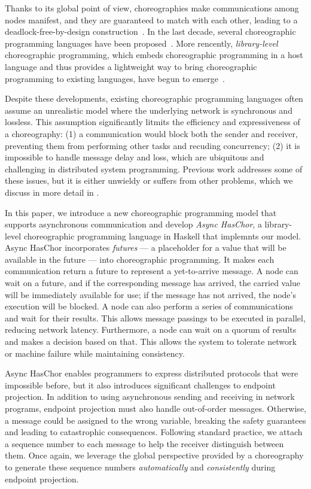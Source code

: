 Thanks to its global point of view, choreographies make communications among nodes manifest, and they are guaranteed to match with each other, leading to a deadlock-free-by-design construction~\citep{deadlock-free-by-design}.
%
In the last decade, several choreographic programming languages have been proposed~\citep{aiocj, choral, pirouette}.
%
More rencently, \emph{library-level} choreographic programming, which embeds choreographic programming in a host language and thus provides a lightweight way to bring choreographic programming to existing languages, have begun to emerge~\citep{haschor, chorus}.

Despite these developments, existing choreographic programming languages often assume an unrealistic model where the underlying network is synchronous and lossless.
%
This assumption significantly litmits the efficiency and expressiveness of a choreography:
%
(1) a communication would block both the sender and receiver, preventing them from performing other tasks and recuding concurrency;
%
(2) it is impossible to handle message delay and loss, which are ubiquitous and challenging in distributed system programming.
%
Previous work addresses some of these issues, but it is either unwieldy or suffers from other problems, which we discuss in more detail in .

In this paper, we introduce a new choreographic programming model that supports asynchronous communication and develop \emph{Async HasChor}, a library-level choreographic programming language in Haskell that implemnts our model.
%
Async HasChor incorporates \emph{futures} --- a placeholder for a value that will be available in the future --- into choreographic programming.
%
It makes each communication return a future to represent a yet-to-arrive message.
%
A node can wait on a future, and if the corresponding message has arrived, the carried value will be immediately available for use;
%
if the message has not arrived, the node's execution will be blocked.
%
A node can also perform a series of communications and wait for their results.
%
This allows message passings to be executed in parallel, reducing network latency.
%
Furthermore, a node can wait on a quorum of results and makes a decision based on that.
%
This allows the system to tolerate network or machine failure while maintaining consistency.

Async HasChor enables programmers to express distributed protocols that were impossible before, but it also introduces significant challenges to endpoint projection.
%
In addition to using asynchronous sending and receiving in network programs, endpoint projection must also handle out-of-order messages.
%
Otherwise, a message could be assigned to the wrong variable, breaking the safety guarantees and leading to catastrophic consequences.
%
Following standard practice, we attach a sequence number to each message to help the receiver distinguish between them.
%
Once again, we leverage the global perspective provided by a choreography to generate these sequence numbers \emph{automatically} and \emph{consistently} during endpoint projection.

